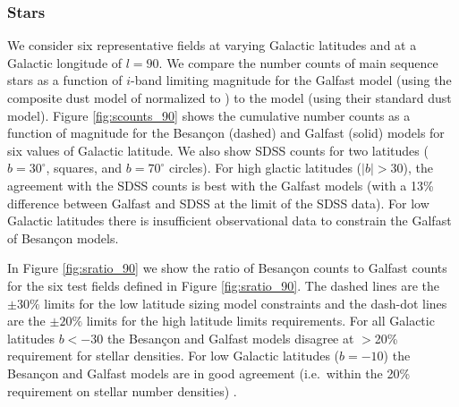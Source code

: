 \documentclass[]{article}
\begin{document}
\subsubsection{Stars}
We consider six representative fields at varying Galactic latitudes
and at a Galactic longitude of $l=90$.  We compare the number counts
of main sequence stars as a function of $i$-band limiting magnitude
for the Galfast model \citep{juric} (using the composite dust model of
\citet{amores05} normalized to \citet{schlegel98}) to the
\citet{besancon} model (using their standard dust model).  Figure
\ref{fig:scounts_90} shows the cumulative number counts as a function
of magnitude for the Besan\c{c}on (dashed) and Galfast (solid) models
for six values of Galactic latitude.  We also show SDSS counts for two
latitudes ($b=30^{\circ}$, squares, and $b=70^{\circ}$ circles).  For
high glactic latitudes ($|b| >30$), the agreement with the SDSS counts
is best with the Galfast models (with a 13\% difference between
Galfast and SDSS at the limit of the SDSS data). For low Galactic
latitudes there is insufficient observational data to constrain the
Galfast of Besan\c{c}on models.

In Figure \ref{fig:sratio_90} we show the ratio of Besan\c{c}on counts
to Galfast counts for the six test fields defined in Figure
\ref{fig:sratio_90}.  The dashed lines are the $\pm30\%$ limits for
the low latitude sizing model constraints and the dash-dot lines are
the $\pm20\%$ limits for the high latitude limits requirements. 
For all Galactic latitudes $b<-30$ the Besan\c{c}on and Galfast models
disagree at $>$20\% requirement for stellar densities. For low
Galactic latitudes ($b=-10$) the Besan\c{c}on  and Galfast models are
in good agreement (i.e.\ within the 20\% requirement on stellar number densities) .


\end{document}
